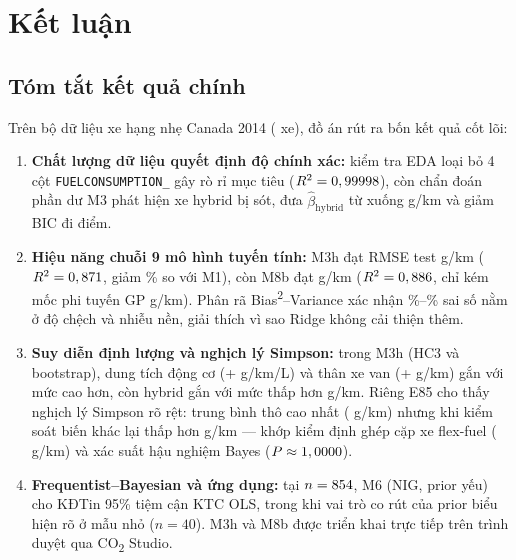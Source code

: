 \section{Kết luận}
\label{sec:conclusion}


\subsection{Tóm tắt kết quả chính}
Trên bộ dữ liệu xe hạng nhẹ Canada 2014 (\nCars{} xe), đồ án rút ra bốn kết quả cốt lõi:
\begin{enumerate}
  \item \textbf{Chất lượng dữ liệu quyết định độ chính xác:} kiểm tra EDA loại bỏ 4 cột \texttt{FUELCONSUMPTION\_\allowbreak *} gây rò rỉ mục tiêu ($R^2 = 0,99998$), còn chẩn đoán phần dư M3 phát hiện \nHybridMissed{} xe hybrid bị sót, đưa $\hat\beta_{\mathrm{hybrid}}$ từ \bHybridOld{} xuống \bHybrid{} g/km và giảm BIC đi \bicDropFlag{} điểm.
  \item \textbf{Hiệu năng chuỗi 9 mô hình tuyến tính:} M3h đạt RMSE test \rmseThreeH{} g/km ($R^2 = 0,871$, giảm \rmseGainThreeH\% so với M1), còn M8b đạt \rmseEightB{} g/km ($R^2 = 0,886$, chỉ kém mốc phi tuyến GP \gpGapEightB{} g/km). Phân rã Bias\textsuperscript{2}--Variance xác nhận \bvBiasShareEightB\%--\bvBiasShareThreeH\% sai số nằm ở độ chệch và nhiễu nền, giải thích vì sao Ridge không cải thiện thêm.
  \item \textbf{Suy diễn định lượng và nghịch lý Simpson:} trong M3h (HC3 và bootstrap), dung tích động cơ (+\bEngine{} g/km/L) và thân xe van (+\bVan{} g/km) gắn với mức \COtwo{} cao hơn, còn hybrid gắn với mức thấp hơn \bHybridAbs{} g/km. Riêng E85 cho thấy nghịch lý Simpson rõ rệt: trung bình thô cao nhất (\meanE{} g/km) nhưng khi kiểm soát biến khác lại thấp hơn \bEEightyFiveAbs{} g/km --- khớp kiểm định ghép cặp \nPairs{} xe flex-fuel (\pairDiff{} g/km) và xác suất hậu nghiệm Bayes ($P \approx 1,0000$).
  \item \textbf{Frequentist--Bayesian và ứng dụng:} tại $n = 854{}$, M6 (NIG, prior yếu) cho KĐTin 95\% tiệm cận KTC OLS, trong khi vai trò co rút của prior biểu hiện rõ ở mẫu nhỏ ($n = 40$). M3h và M8b được triển khai trực tiếp trên trình duyệt qua CO\textsubscript{2} Studio.
\end{enumerate}


